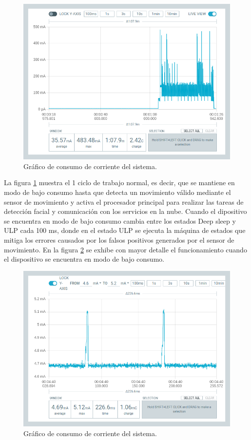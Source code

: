 \begin{figure}[h]
	\centering
	\includegraphics[scale=0.45]{./Figures/test_ulp1.png}
	\caption{Gráfico de consumo de corriente del sistema.}
	\label{fig:test_ulp1}
\end{figure}

La figura \ref{fig:test_ulp1} muestra el 1 ciclo de trabajo normal, es decir, que se mantiene en modo de bajo consumo hasta que detecta un movimiento válido mediante el sensor de movimiento y activa el procesador principal para realizar las tareas de detección facial y comunicación con los servicios en la nube. Cuando el dipositivo se encuentra en modo de bajo consumo cambia entre los estados Deep sleep y ULP cada 100 ms, donde en el estado ULP se ejecuta la máquina de estados que mitiga los errores causados por los falsos positivos generados por el sensor de movimiento. En la figura \ref{fig:test_ulp2} se exhibe con mayor detalle el funcionamiento cuando el dispositivo se encuentra en modo de bajo consumo.

\clearpage


\begin{figure}[h]
	\centering
	\includegraphics[scale=0.45]{./Figures/test_ulp2.png}
	\caption{Gráfico de consumo de corriente del sistema.}
	\label{fig:test_ulp2}
\end{figure}

